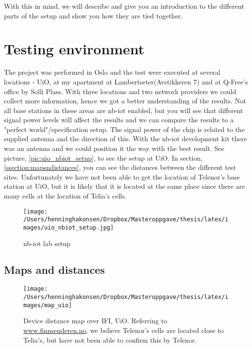 \documentclass[USenglish]{ifimaster}  %
\begin{document}
With this in mind, we will describe and give you an introduction to the different parts of the setup and show you how they are tied together.

\section{Testing environment}
The project was performed in Oslo and the test were executed at several locations - UiO, at my apartment at Lambertseter(Avstikkeren 7) and at Q-Free's office by Solli Plass. With three locations and two network providers we could collect more information, hence we got a better understanding of the results.
Not all base stations in these areas are \acrshort{nb-iot} enabled, but you will see that different signal power levels will affect the results and we can compare the results to a "perfect world"/specification setup. The signal power of the chip is related to the supplied antenna and the direction of this. With the \acrshort{nb-iot} development kit there was an antenna and we could position it the way with the best result. See picture, \vref{pic:uio_nbiot_setup}, to see the setup at UiO. In section, \vref{ssection:mapsndistances}, you can see the distances between the different test sites. Unfortunately we have not been able to get the location of Telenor's base station at UiO, but it is likely that it is located at the same place since there are many cells at the location of Telia's cells.

\begin{figure}[H]
  \centering\texttt{[image: /Users/henninghakonsen/Dropbox/Masteroppgave/thesis/latex/images/uio\_nbiot\_setup.jpg]}
  \caption{\acrshort{nb-iot} lab setup}
  \label{pic:uio_nbiot_setup}
\end{figure}

\subsection{Maps and distances} \label{ssection:mapsndistances}
\begin{figure}[H]
  \centering\texttt{[image: /Users/henninghakonsen/Dropbox/Masteroppgave/thesis/latex/images/map\_uio]}
  \caption[Distance map - IFI, UiO]{Device distance map over IFI, UiO. Referring to \url{www.finnsenderen.no}\cite{online:finnsenderen}, we believe Telenor's cells are located close to Telia's, but have not been able to confirm this by Telenor.}
  \label{figure:map_uio}
\end{figure}
\end{document}
